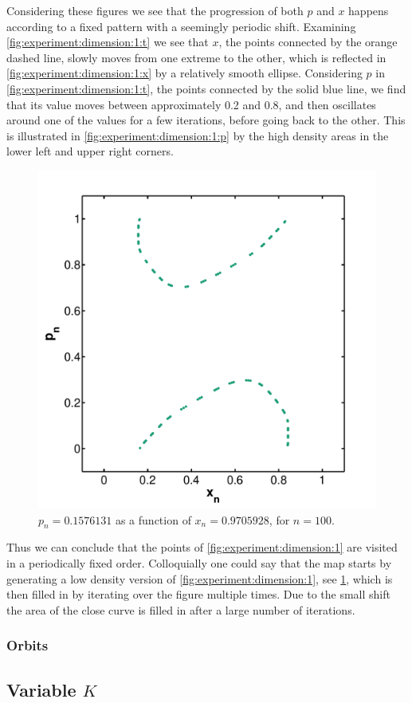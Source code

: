 	Considering these figures we see that the progression of both $p$ and $x$ happens according to a fixed pattern with a seemingly periodic shift. Examining \cref{fig:experiment:dimension:1:t} we see that $x$, the points connected by the orange dashed line, slowly moves from one extreme to the other, which is reflected in \cref{fig:experiment:dimension:1:x} by a relatively smooth ellipse. Considering $p$ in \cref{fig:experiment:dimension:1:t}, the points connected by the solid blue line, we find that its value moves between approximately 0.2 and 0.8, and then oscillates around one of the values for a few iterations, before going back to the other. This is illustrated in \cref{fig:experiment:dimension:1:p} by the high density areas in the lower left and upper right corners.

	\begin{figure}
		\centering
		\includegraphics[width=0.9\columnwidth]{./img/assignment_a_1_dim_n100}
		\caption{$p_n = \num{0.1576131}$ as a function of $x_n= \num{0.9705928}$, for $n = 100$.}
		\label{fig:experiment:a_1_n100}
	\end{figure}

	Thus we can conclude that the points of \cref{fig:experiment:dimension:1} are visited in a periodically fixed order. Colloquially one could say that the map starts by generating a low density version of \cref{fig:experiment:dimension:1}, see \cref{fig:experiment:a_1_n100}, which is then filled in by iterating over the figure multiple times. Due to the small shift the area of the close curve is filled in after a large number of iterations.

	\subsubsection{Orbits}	

	

\subsection[]{Variable $K$}
\label{ss:variable}